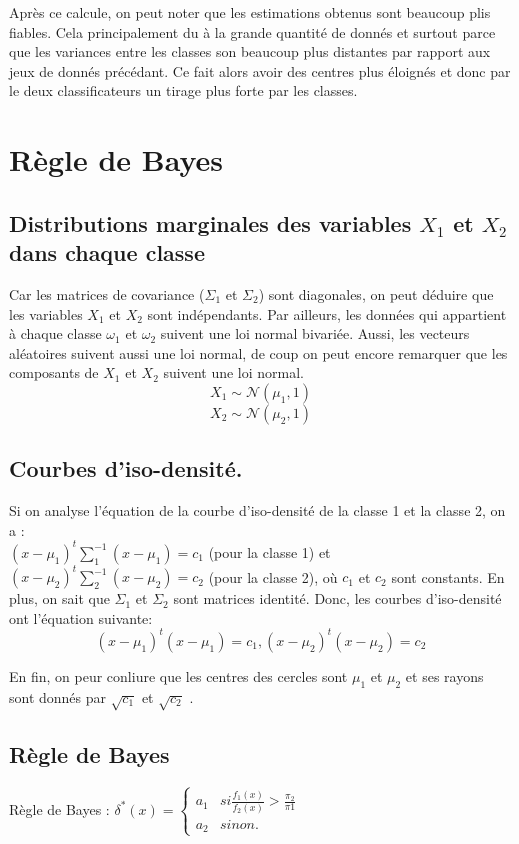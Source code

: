 \documentclass[a4paper,11pt]{article}
\begin{document}
Après ce calcule, on peut noter que les estimations obtenus sont beaucoup plis fiables. Cela principalement du à la grande quantité de donnés et surtout parce que les variances entre les classes son beaucoup plus distantes par rapport aux jeux de donnés précédant. Ce fait alors avoir des centres plus éloignés et donc par le deux classificateurs un tirage plus forte par les classes.

\pagebreak


\section*{Règle de Bayes}

\subsection{Distributions marginales des variables $X_1$ et $X_2$ dans chaque classe}

Car les matrices de covariance ($\Sigma_1$ et $\Sigma_2$) sont diagonales, on peut déduire que les variables $X_1$ et $X_2$ sont indépendants. Par ailleurs, les données qui appartient à chaque classe $\omega_1$ et $\omega_2$ suivent une loi normal bivariée.
Aussi, les vecteurs aléatoires suivent aussi une loi normal, de coup on peut encore remarquer que les composants de $X_1$ et $X_2$ suivent une loi normal.
\[X_1 \sim \mathcal{N}(\mu_{1}, 1)\]
\[X_2 \sim \mathcal{N}(\mu_{2}, 1)\]


\subsection{Courbes d’iso-densité.}

Si on analyse l’équation de la courbe d’iso-densité de la classe 1 et la classe 2, on a :\\
$(x - \mu_1)^t\sum_1^{-1}(x-\mu_1)=c_1$  (pour la classe 1) et 
$(x - \mu_2)^t\sum_2^{-1}(x-\mu_2)=c_2$ (pour la classe 2), où $c_1$ et $c_2$ sont constants.
En plus, on sait que $\Sigma_1$ et $\Sigma_2$ sont matrices identité. Donc, les courbes d'iso-densité ont l'équation suivante:
\[(x-\mu_1)^t(x-\mu_1) = c_1, (x-\mu_2)^t(x-\mu_2) = c_2\]

En fin, on peur conliure que les centres des cercles sont $\mu_1$ et $\mu_2$ et ses rayons sont donnés par $\sqrt{c_1}$ et $\sqrt{c_2}$ .


\subsection*{Règle de Bayes}
Règle de Bayes :
$\delta^{*}(x) =
\begin{cases} 
  a_{1} & si \frac{f_{1}(x)}{f_{2}(x)} > \frac{\pi_{2}}{\pi{1}} \\
  a_{2} & sinon.
\end{cases}$\\ \\
\end{document}
